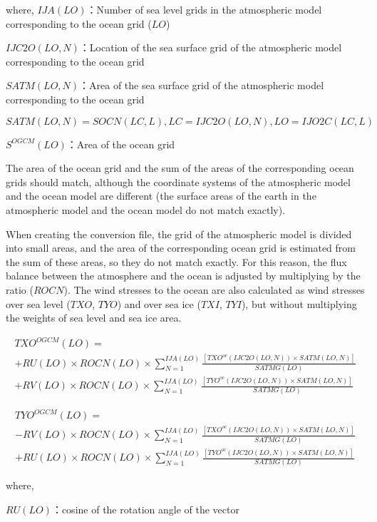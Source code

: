where, \(IJA(LO)\)：Number of sea level grids in the atmospheric model corresponding to the ocean grid (\(LO\))

\(IJC2O(LO,N)\)：Location of the sea surface grid of the atmospheric model corresponding to the ocean grid

\(SATM(LO,N)\)：Area of the sea surface grid of the atmospheric model corresponding to the ocean grid

\(SATM(LO,N)=SOCN(LC,L),LC=IJC2O(LO,N),LO=IJO2C(LC,L)\)

\(S^{OGCM}(LO)\)：Area of the ocean grid

The area of the ocean grid and the sum of the areas of the corresponding ocean grids should match, although the coordinate systems of the atmospheric model and the ocean model are different (the
surface areas of the earth in the atmospheric model and the ocean model do not match exactly).

When creating the conversion file, the grid of the atmospheric model is divided into small areas, and the area of the corresponding ocean grid is estimated from the sum of these areas, so they do not
match exactly. For this reason, the flux balance between the atmosphere and the ocean is adjusted by multiplying by the ratio (\(ROCN\)). The wind stresses to the ocean are also calculated as wind
stresses over sea level (\(TXO\), \(TYO\)) and over sea ice (\(TXI\), \(TYI\)), but without multiplying the weights of sea level and sea ice area.

\begin{eqnarray} TXO^{OGCM}(LO) =  \\ + RU(LO) \times ROCN(LO) \times \sum_{N=1}^{IJA(LO)} \frac{[TXO^{oc}(IJC2O(LO,N)) \times SATM(LO,N)]}{SATMG(LO)} \\ + RV(LO) \times ROCN(LO) \times \sum_{N=1}^{IJA(LO)}\frac{[TYO^{oc}(IJC2O(LO,N)) \times SATM(LO,N)]}{SATMG(LO)} \end{eqnarray}

\begin{eqnarray} TYO^{OGCM}(LO)= \\ -RV(LO) \times ROCN(LO) \times \sum_{N=1}^{IJA(LO)} \frac{[TXO^{oc}(IJC2O(LO,N)) \times SATM(LO,N)]}{SATMG(LO)} \\ + RU(LO) \times ROCN(LO) \times \sum_{N=1}^{IJA(LO)}\frac{[TYO^{oc}(IJC2O(LO,N)) \times SATM(LO,N)]}{SATMG(LO)} \end{eqnarray}

where,

\(RU(LO)\)：cosine of the rotation angle of the vector

